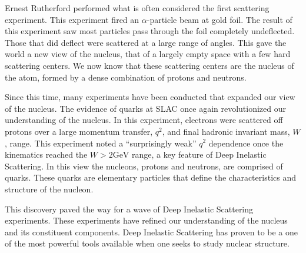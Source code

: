 
Ernest Rutherford performed what is often considered the first scattering experiment. This experiment fired an $\alpha$-particle beam at gold foil. The result of this experiment saw most particles pass through the foil completely undeflected. Those that did deflect were scattered at a large range of angles. This gave the world a new view of the nucleus, that of a largely empty space with a few hard scattering centers. We now know that these scattering centers are the nucleus of the atom, formed by a dense combination of protons and neutrons.\cite{GRIF}

Since this time, many experiments have been conducted that expanded our view of the nucleus. The evidence of quarks at SLAC once again revolutionized our understanding of the nucleus. In this experiment, electrons were scattered off protons over a large momentum transfer, $q^2$, and final hadronic invariant mass, $W$, range. This experiment noted a ``surprisingly weak'' $q^2$ dependence once the kinematics reached the $W>2 \textrm{GeV}$ range, a key feature of Deep Inelastic Scattering.\cite{SLAC_DIS} In this view the nucleons, protons and neutrons, are comprised of quarks. These quarks are elementary particles that define the characteristics and structure of the nucleon.\cite{DoQ}

This discovery paved the way for a wave of Deep Inelastic Scattering experiments. These experiments have refined our understanding of the nucleus and its constituent components. Deep Inelastic Scattering has proven to be a one of the most powerful tools available when one seeks to study nuclear structure.

